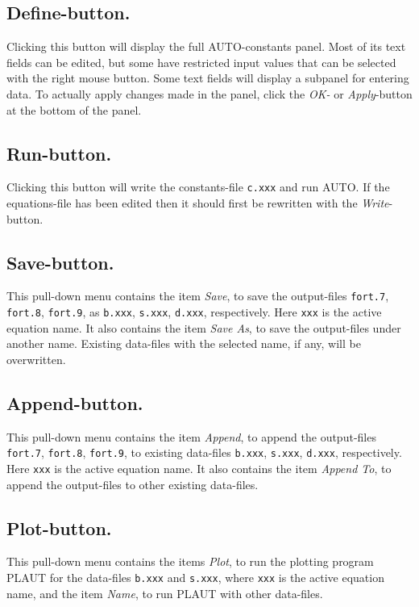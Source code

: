 \documentclass[12pt]{report}
\begin{document}
\subsection{ Define-button.}
Clicking this button will display the full {\cal AUTO}-constants panel.
Most of its text fields can be edited,
but some have restricted input values that can be selected with
the right mouse button.
Some text fields will display a subpanel for entering data.
To actually apply changes made in the panel, click the
{\it OK-} or {\it Apply}-button at the bottom of the panel.



\subsection{ Run-button.}
Clicking this button will write the constants-file {\tt c.xxx} and run {\cal AUTO}.
If the equations-file has been edited then it should first be rewritten 
with the {\it Write}-button. 


\subsection{ Save-button.}
This pull-down menu contains the item
{\it Save},
to save the output-files {\tt fort.7}, {\tt fort.8}, {\tt fort.9},
as {\tt b.xxx}, {\tt s.xxx}, {\tt d.xxx}, respectively.
Here {\tt xxx} is the active equation name.
It also contains the item
{\it Save As}, 
to save the output-files under another name. 
Existing data-files with the selected name, if any, will be overwritten.


\subsection{ Append-button.}
This pull-down menu contains the item
{\it Append},
to append the output-files {\tt fort.7}, {\tt fort.8}, {\tt fort.9},
to existing data-files {\tt b.xxx}, {\tt s.xxx}, {\tt d.xxx}, respectively.
Here {\tt xxx} is the active equation name.
It also contains the item
{\it Append To}, 
to append the output-files to other existing data-files.

\subsection{ Plot-button.}
This pull-down menu contains the items
{\it Plot},
to run the plotting program {\cal PLAUT} for the data-files 
{\tt b.xxx} and {\tt s.xxx},
where {\tt xxx} is the active equation name,
and the item
{\it Name}, 
to run {\cal PLAUT} with other data-files.
\end{document}
